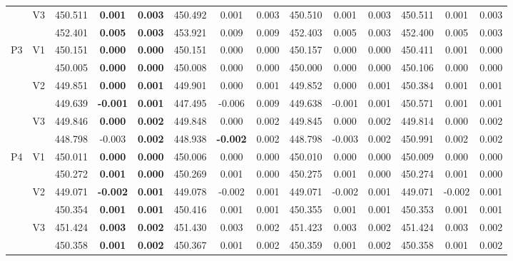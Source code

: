 \documentclass[12pt,a4paper]{article}
\begin{document}
\begin{sidewaystable}[ht]
{\begin{tabular}{cc|ccc|ccc|ccc|ccc|}
   & \multirow{2}{*}{V3} & 450.511 & \textbf{0.001} & \textbf{0.003} & 450.492 & 0.001 & 0.003 & 450.510 & 0.001 & 0.003 & 450.511 & 0.001 & 0.003 \\ 
   &  & 452.401 & \textbf{0.005} & \textbf{0.003} & 453.921 & 0.009 & 0.009 & 452.403 & 0.005 & 0.003 & 452.400 & 0.005 & 0.003 \\ 
   \hline \hline\multirow{6}{*}{P3} & \multirow{2}{*}{V1} & 450.151 & \textbf{0.000} & \textbf{0.000} & 450.151 & 0.000 & 0.000 & 450.157 & 0.000 & 0.000 & 450.411 & 0.001 & 0.000 \\ 
   &  & 450.005 & \textbf{0.000} & \textbf{0.000} & 450.008 & 0.000 & 0.000 & 450.000 & 0.000 & 0.000 & 450.106 & 0.000 & 0.000 \\ 
   & \multirow{2}{*}{V2} & 449.851 & \textbf{0.000} & \textbf{0.001} & 449.901 & 0.000 & 0.001 & 449.852 & 0.000 & 0.001 & 450.384 & 0.001 & 0.001 \\ 
   &  & 449.639 & \textbf{-0.001} & \textbf{0.001} & 447.495 & -0.006 & 0.009 & 449.638 & -0.001 & 0.001 & 450.571 & 0.001 & 0.001 \\ 
   & \multirow{2}{*}{V3} & 449.846 & \textbf{0.000} & \textbf{0.002} & 449.848 & 0.000 & 0.002 & 449.845 & 0.000 & 0.002 & 449.814 & 0.000 & 0.002 \\ 
   &  & 448.798 & -0.003 & \textbf{0.002} & 448.938 & \textbf{-0.002} & 0.002 & 448.798 & -0.003 & 0.002 & 450.991 & 0.002 & 0.002 \\ 
   \hline \hline\multirow{6}{*}{P4} & \multirow{2}{*}{V1} & 450.011 & \textbf{0.000} & \textbf{0.000} & 450.006 & 0.000 & 0.000 & 450.010 & 0.000 & 0.000 & 450.009 & 0.000 & 0.000 \\ 
   &  & 450.272 & \textbf{0.001} & \textbf{0.000} & 450.269 & 0.001 & 0.000 & 450.275 & 0.001 & 0.000 & 450.274 & 0.001 & 0.000 \\ 
   & \multirow{2}{*}{V2} & 449.071 & \textbf{-0.002} & \textbf{0.001} & 449.078 & -0.002 & 0.001 & 449.071 & -0.002 & 0.001 & 449.071 & -0.002 & 0.001 \\ 
   &  & 450.354 & \textbf{0.001} & \textbf{0.001} & 450.416 & 0.001 & 0.001 & 450.355 & 0.001 & 0.001 & 450.353 & 0.001 & 0.001 \\ 
   & \multirow{2}{*}{V3} & 451.424 & \textbf{0.003} & \textbf{0.002} & 451.430 & 0.003 & 0.002 & 451.423 & 0.003 & 0.002 & 451.424 & 0.003 & 0.002 \\ 
   &  & 450.358 & \textbf{0.001} & \textbf{0.002} & 450.367 & 0.001 & 0.002 & 450.359 & 0.001 & 0.002 & 450.358 & 0.001 & 0.002 \\ 

\end{tabular}}
\end{sidewaystable}
\end{document}
